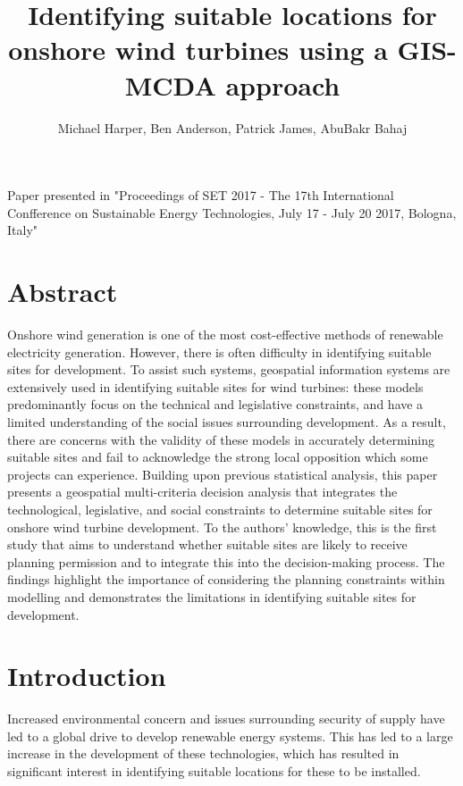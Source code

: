 \documentclass[a4paper,]{article}
\title{Identifying suitable locations for onshore wind turbines using a
GIS-MCDA approach}
\author{Michael Harper, Ben Anderson, Patrick James, AbuBakr Bahaj}
\date{}
\theoremstyle{definition}
\theoremstyle{definition}
\theoremstyle{remark}
\begin{document}
\maketitle

{\selectfont
  \renewcommand{\encodingdefault}{T1}
  \renewcommand{\rmdefault}{cmss}

\begin{mdframed}[backgroundcolor=black!5] 
Paper presented in "Proceedings of SET 2017 - The 17th International Confference on Sustainable Energy Technologies, July 17 - July 20 2017, Bologna, Italy"
\end{mdframed}

\section*{Abstract}\label{abstract}

Onshore wind generation is one of the most cost-effective methods of
renewable electricity generation. However, there is often difficulty in
identifying suitable sites for development. To assist such systems,
geospatial information systems are extensively used in identifying
suitable sites for wind turbines: these models predominantly focus on
the technical and legislative constraints, and have a limited
understanding of the social issues surrounding development. As a result,
there are concerns with the validity of these models in accurately
determining suitable sites and fail to acknowledge the strong local
opposition which some projects can experience. Building upon previous
statistical analysis, this paper presents a geospatial multi-criteria
decision analysis that integrates the technological, legislative, and
social constraints to determine suitable sites for onshore wind turbine
development. To the authors' knowledge, this is the first study that
aims to understand whether suitable sites are likely to receive planning
permission and to integrate this into the decision-making process. The
findings highlight the importance of considering the planning
constraints within modelling and demonstrates the limitations in
identifying suitable sites for development.

\section{Introduction}\label{introduction}

Increased environmental concern and issues surrounding security of
supply have led to a global drive to develop renewable energy systems.
This has led to a large increase in the development of these
technologies, which has resulted in significant interest in identifying
suitable locations for these to be installed.

}
\end{document}
